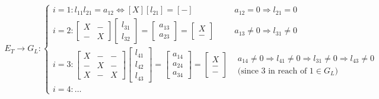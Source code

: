 \documentclass{article}
\begin{document}
\begin{align*}
    E_T \longrightarrow G_L: \begin{cases}
        i=1: l_{11}l_{21} = a_{12} \Longleftrightarrow [X][l_{21}] = [-]& a_{12} = 0 \Rightarrow l_{21} = 0 \\
        i=2: \begin{bmatrix} X & -\\ - & X \end{bmatrix} \begin{bmatrix} l_{31} \\ l_{32} \end{bmatrix} = \begin{bmatrix} a_{13}\\a_{23} \end{bmatrix} = \begin{bmatrix} X\\- \end{bmatrix}& a_{13}\neq 0 \Rightarrow l_{31} \neq 0\\
        i=3: \begin{bmatrix} X & - & -\\ - & X & -\\X & - & X \end{bmatrix} \begin{bmatrix} l_{41} \\ l_{42} \\ l_{43} \end{bmatrix} = \begin{bmatrix} a_{14}\\a_{24} \\a_{34}\end{bmatrix} = \begin{bmatrix} X\\-\\- \end{bmatrix} & \begin{matrix}
            a_{14}\neq 0 \Rightarrow l_{41} \neq 0 \Longrightarrow l_{31}\neq 0 \Rightarrow l_{43}\neq 0 \\ \textrm{(since $3$ in reach of $1 \in G_L$)}
        \end{matrix} \\
        i=4: \dots
    \end{cases}\\
\end{align*}
\end{document}

